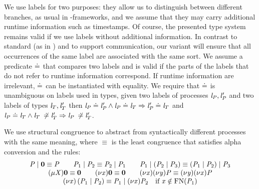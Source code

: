 We use labels for two purposes:
they allow us to distinguish between different branches, as usual in \MPST-frameworks, and we assume that they may carry additional runtime information such as time\-stamps.
Of course, the presented type system remains valid if we use labels without additional information.
In contrast to standard \MPST (as \eg in \cite{hondaYoshidaCarbone16}) and to support \unrel communication, our \MPST variant will ensure that all occurrences of the same label are associated with the same sort.
We assume a predicate $ \compL[] $ that compares two labels and is valid if the parts of the labels that do not refer to runtime information correspond.
If runtime information are irrelevant, $ \compL[] $ can be instantiated with equality.
We require that $ \compL[] $ is unambiguous on labels used in types, \ie given two labels of processes $ \Label_{\PT}, \Label_{\PT}' $ and two labels of types $ \Label_{\LT}, \Label_{\LT}' $ then $ \Label_{\PT} \compL \Label_{\PT}' \wedge \Label_{\PT} \compL \Label_{\LT} \Rightarrow \Label_{\PT}' \compL \Label_{\LT} $ and $ \Label_{\PT} \compL \Label_{\LT} \wedge \Label_{\LT} \nCompL \Label_{\LT}' \Rightarrow \Label_{\PT} \nCompL \Label_{\LT}' $.

We use structural congruence to abstract from syntactically different processes with the same meaning, where $ \equiv $ is the least congruence that satisfies alpha conversion and the rules:
\[ \begin{array}{c}
	\PT \mid \PEnd \equiv \PT
	\hspace{2em} \PT_1 \mid \PT_2 \equiv \PT_2 \mid \PT_1
	\hspace{2em} \PT_1 \mid \left( \PT_2 \mid \PT_3 \right) \equiv \left( \PT_1 \mid \PT_2 \right) \mid \PT_3\\
	\PRep{\ProcV}{\PEnd} \equiv \PEnd
	\hspace{2em} \PRes{\Args}{\PEnd} \equiv \PEnd
	\hspace{2em} \PRes{\Args}{\PRes{\Args[y]}{\PT}} \equiv \PRes{\Args[y]}{\PRes{\Args}{\PT}}\\
	\PRes{\Args}{\left( \PT_1 \mid \PT_2 \right)} \equiv \PT_1 \mid \PRes{\Args}{\PT_2} \quad \text{if } \Args \notin \FreeNames{\PT_1}
\end{array} \]

